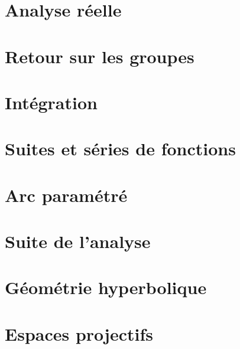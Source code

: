 \chapter{Analyse réelle}








\chapter{Retour sur les groupes}





\chapter{Intégration}









\chapter{Suites et séries de fonctions}





\chapter{Arc paramétré}



\chapter{Suite de l'analyse}





\chapter{Géométrie hyperbolique}


\chapter{Espaces projectifs}




